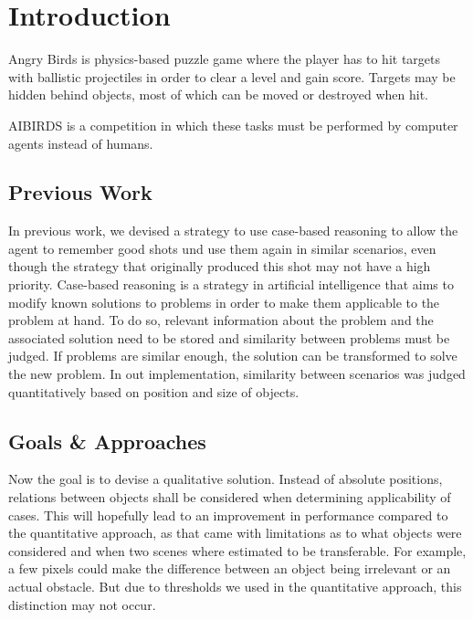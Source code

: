 \section{Introduction}\label{sec:intro}

Angry Birds is physics-based puzzle game where the player has to hit targets with ballistic projectiles in order to clear a level and gain score.
Targets may be hidden behind objects, most of which can be moved or destroyed when hit.

AIBIRDS is a competition in which these tasks must be performed by computer agents instead of humans.


\subsection{Previous Work}
In previous work, we devised a strategy to use case-based reasoning to allow the agent to remember good shots und use them again in similar scenarios, even though the strategy that originally produced this shot may not have a high priority.
Case-based reasoning is a strategy in artificial intelligence that aims to modify known solutions to problems in order to make them applicable to the problem at hand.
To do so, relevant information about the problem and the associated solution need to be stored and similarity between problems must be judged.
If problems are similar enough, the solution can be transformed to solve the new problem.
In out implementation, similarity between scenarios was judged quantitatively based on position and size of objects.


\subsection{Goals \& Approaches}

Now the goal is to devise a qualitative solution.
Instead of absolute positions, relations between objects shall be considered when determining applicability of cases.
This will hopefully lead to an improvement in performance compared to the quantitative approach, as that came with limitations as to what objects were considered and when two scenes where estimated to be transferable.
For example, a few pixels could make the difference between an object being irrelevant or an actual obstacle. 
But due to thresholds we used in the quantitative approach, this distinction may not occur. %

